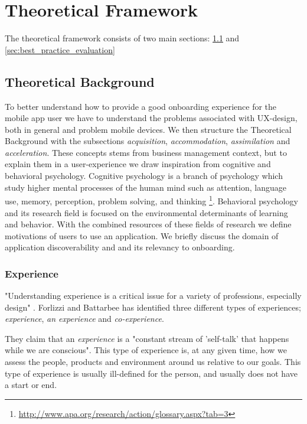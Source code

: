\chapter{Theoretical Framework}
\label{chap:theoretical_framework}
The theoretical framework consists of two main sections: \ref{sec:theoretical_background} and \ref{sec:best_practice_evaluation}


\section{Theoretical Background}
\label{sec:theoretical_background}
To better understand how to provide a good onboarding experience for the mobile app user we have to understand the problems associated with UX-design, both in general and problem mobile devices. We then structure the Theoretical Background with the subsections \textit{acquisition}, \textit{accommodation}, \textit{assimilation} and \textit{acceleration}. These concepts stems from business management context, but to explain them in a user-experience we draw inspiration from cognitive and behavioral psychology. Cognitive psychology is a branch of psychology which study higher mental processes of the human mind such as attention, language use, memory, perception, problem solving, and thinking \footnote{\url{http://www.apa.org/research/action/glossary.aspx?tab=3}}. Behavioral psychology and its research field is focused on the environmental determinants of learning and behavior. With the combined resources of these fields of research we define motivations of users to use an application. We briefly discuss the domain of application discoverability and and its relevancy to onboarding.

\subsection{Experience}
"Understanding experience is a critical issue for a variety of professions, especially design" \cite{Forlizzi2004}. Forlizzi and Battarbee has identified three different types of experiences; \textit{experience}, \textit{an experience} and \textit{co-experience}.

They claim that an \textit{experience} is a "constant stream of 'self-talk' that happens while we are conscious". This type of experience is, at any given time, how we assess the people, products and environment around us relative to our goals. This type of experience is usually ill-defined for the person, and usually does not have a start or end.

